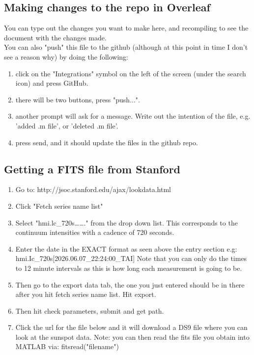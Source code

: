 \documentclass[a4paper]{article}
\begin{document}
\subsection{Making changes to the repo in Overleaf}
You can type out the changes you want to make here, and recompiling to see the document with the changes made. \\
You can also "push" this file to the github (although at this point in time I don't see a reason why) by doing the following:
\begin{enumerate}
    \item click on the "Integrations" symbol on the left of the screen (under the search icon) and press GitHub.
    \item there will be two buttons, press "push...".
    \item another prompt will ask for a message. Write out the intention of the file, e.g. 'added .m file', or 'deleted .m file'.
    \item press send, and it should update the files in the github repo.
\end{enumerate} 

\subsection{Getting a FITS file from Stanford }
\begin{enumerate}

\item Go to: http://jsoc.stanford.edu/ajax/lookdata.html 

\item Click "Fetch series name list"

\item Select "hmi.lc\_720s……." from the drop down list. This corresponds to the continuum intensities with a cadence of 720 seconds. 

\item Enter the date in the EXACT format as seen above the entry section e.g:
hmi.Ic\_720s[2026.06.07\_22:24:00\_TAI] 
Note that you can only do the times to 12 minute intervals as this is how long each measurement is going to be. 

\item Then go to the export data tab, the one you just entered should be in there after you hit fetch series name list. Hit export.

\item Then hit check parameters, submit and get path.

\item Click the url for the file below and it will download a DS9 file where you can look at the sunspot data.
Note: you can then read the fits file you obtain into MATLAB via:  fitsread("filename")
\end{enumerate}
\end{document}
